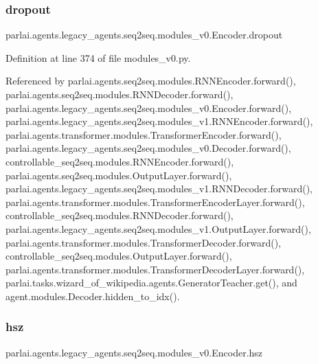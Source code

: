 \subsubsection{\texorpdfstring{dropout}{dropout}}
{\footnotesize\ttfamily parlai.\+agents.\+legacy\+\_\+agents.\+seq2seq.\+modules\+\_\+v0.\+Encoder.\+dropout}



Definition at line 374 of file modules\+\_\+v0.\+py.



Referenced by parlai.\+agents.\+seq2seq.\+modules.\+R\+N\+N\+Encoder.\+forward(), parlai.\+agents.\+seq2seq.\+modules.\+R\+N\+N\+Decoder.\+forward(), parlai.\+agents.\+legacy\+\_\+agents.\+seq2seq.\+modules\+\_\+v0.\+Encoder.\+forward(), parlai.\+agents.\+legacy\+\_\+agents.\+seq2seq.\+modules\+\_\+v1.\+R\+N\+N\+Encoder.\+forward(), parlai.\+agents.\+transformer.\+modules.\+Transformer\+Encoder.\+forward(), parlai.\+agents.\+legacy\+\_\+agents.\+seq2seq.\+modules\+\_\+v0.\+Decoder.\+forward(), controllable\+\_\+seq2seq.\+modules.\+R\+N\+N\+Encoder.\+forward(), parlai.\+agents.\+seq2seq.\+modules.\+Output\+Layer.\+forward(), parlai.\+agents.\+legacy\+\_\+agents.\+seq2seq.\+modules\+\_\+v1.\+R\+N\+N\+Decoder.\+forward(), parlai.\+agents.\+transformer.\+modules.\+Transformer\+Encoder\+Layer.\+forward(), controllable\+\_\+seq2seq.\+modules.\+R\+N\+N\+Decoder.\+forward(), parlai.\+agents.\+legacy\+\_\+agents.\+seq2seq.\+modules\+\_\+v1.\+Output\+Layer.\+forward(), parlai.\+agents.\+transformer.\+modules.\+Transformer\+Decoder.\+forward(), controllable\+\_\+seq2seq.\+modules.\+Output\+Layer.\+forward(), parlai.\+agents.\+transformer.\+modules.\+Transformer\+Decoder\+Layer.\+forward(), parlai.\+tasks.\+wizard\+\_\+of\+\_\+wikipedia.\+agents.\+Generator\+Teacher.\+get(), and agent.\+modules.\+Decoder.\+hidden\+\_\+to\+\_\+idx().

\mbox{\label{classparlai_1_1agents_1_1legacy__agents_1_1seq2seq_1_1modules__v0_1_1Encoder_ad23bedb1c44da264f0916883a9458a61}} 
\subsubsection{\texorpdfstring{hsz}{hsz}}
{\footnotesize\ttfamily parlai.\+agents.\+legacy\+\_\+agents.\+seq2seq.\+modules\+\_\+v0.\+Encoder.\+hsz}



